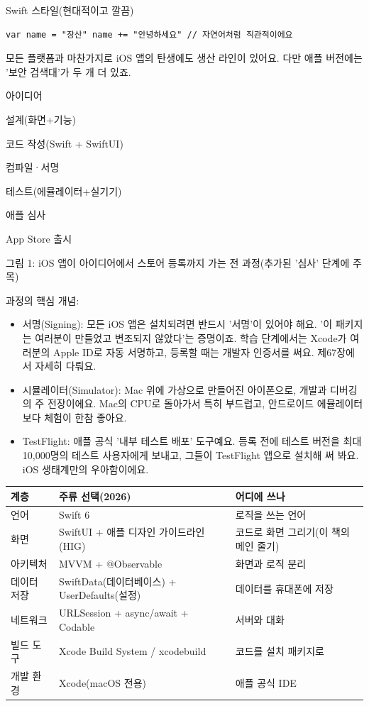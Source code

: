 Swift 스타일(현대적이고 깔끔)

\begin{lstlisting}
var name = "장산" name += "안녕하세요" // 자연어처럼 직관적이에요
\end{lstlisting}


모든 플랫폼과 마찬가지로 iOS 앱의 탄생에도 생산 라인이 있어요. 다만 애플 버전에는 '보안 검색대'가 두 개 더 있죠.

아이디어

설계(화면+기능)

코드 작성(Swift + SwiftUI)

컴파일·서명

테스트(에뮬레이터+실기기)

애플 심사

App Store 출시

\begin{center}\small\color{gray}그림 1: iOS 앱이 아이디어에서 스토어 등록까지 가는 전 과정(추가된 '심사' 단계에 주목)\end{center}

과정의 핵심 개념:

\begin{itemize}
  \item 서명(Signing): 모든 iOS 앱은 설치되려면 반드시 '서명'이 있어야 해요. '이 패키지는 여러분이 만들었고 변조되지 않았다'는 증명이죠. 학습 단계에서는 Xcode가 여러분의 Apple ID로 자동 서명하고, 등록할 때는 개발자 인증서를 써요. 제67장에서 자세히 다뤄요.
  \item 시뮬레이터(Simulator): Mac 위에 가상으로 만들어진 아이폰으로, 개발과 디버깅의 주 전장이에요. Mac의 CPU로 돌아가서 특히 부드럽고, 안드로이드 에뮬레이터보다 체험이 한참 좋아요.
  \item TestFlight: 애플 공식 '내부 테스트 배포' 도구예요. 등록 전에 테스트 버전을 최대 10,000명의 테스트 사용자에게 보내고, 그들이 TestFlight 앱으로 설치해 써 봐요. iOS 생태계만의 우아함이에요.
\end{itemize}


\begin{center}
\begin{tabularx}{\linewidth}{|X|X|X|}
\hline
\textbf{계층} & \textbf{주류 선택(2026)} & \textbf{어디에 쓰나} \tabularnewline
\hline
언어 & Swift 6 & 로직을 쓰는 언어 \tabularnewline
화면 & SwiftUI + 애플 디자인 가이드라인(HIG) & 코드로 화면 그리기(이 책의 메인 줄기) \tabularnewline
아키텍처 & MVVM + @Observable & 화면과 로직 분리 \tabularnewline
데이터 저장 & SwiftData(데이터베이스) + UserDefaults(설정) & 데이터를 휴대폰에 저장 \tabularnewline
네트워크 & URLSession + async/await + Codable & 서버와 대화 \tabularnewline
빌드 도구 & Xcode Build System / xcodebuild & 코드를 설치 패키지로 \tabularnewline
개발 환경 & Xcode(macOS 전용) & 애플 공식 IDE \tabularnewline
\hline
\end{tabularx}
\end{center}

